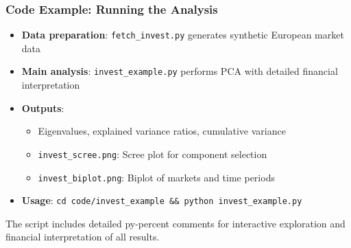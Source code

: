 \documentclass[aspectratio=169]{beamer}
\begin{document}
\begin{frame}
    \frametitle{Code Example: Running the Analysis}
    \begin{itemize}
        \item \textbf{Data preparation}: \texttt{fetch\_invest.py} generates synthetic European market data \pause
        \item \textbf{Main analysis}: \texttt{invest\_example.py} performs PCA with detailed financial interpretation \pause
        \item \textbf{Outputs}: 
              \begin{itemize}
                  \item Eigenvalues, explained variance ratios, cumulative variance \pause
                  \item \texttt{invest\_scree.png}: Scree plot for component selection \pause
                  \item \texttt{invest\_biplot.png}: Biplot of markets and time periods \pause
              \end{itemize}
        \item \textbf{Usage}: \texttt{cd code/invest\_example \&\& python invest\_example.py} \pause
    \end{itemize}
    \vspace{6pt}
    The script includes detailed py-percent comments for interactive exploration and financial interpretation of all results.
\end{frame}
\end{document}
